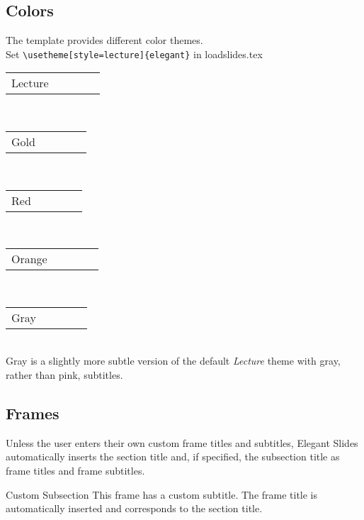 \documentclass[
11pt,notheorems,hyperref={pdfauthor=whatever}
]{beamer}
\begin{document}
\subsection{Colors}
\begin{frame}[fragile]
	\centering
	The template provides different color themes.\\
	Set \verb+\usetheme[style=lecture]{elegant}+ in loadslides.tex\\[0.8cm]
	\newcommand{\colorRow}[1]{
	\begin{tabular}{p{4cm}cccc}
	#1 & \cellcolor{primary}\hspace*{1cm} &\cellcolor{secondary}\hspace*{1cm}&\cellcolor{tertiary}\hspace*{1cm}\\
 	\end{tabular}
 	}
 	\colorRow{Lecture}\\[0.3cm]
 	\colorRow{Gold}\\[0.3cm]
 	\colorRow{Red}\\[0.3cm]
 	\colorRow{Orange}\\[0.3cm]
 	\colorRow{Gray}\\[0.3cm]

 \centering Gray is a slightly more subtle version of the default \textit{Lecture} theme with gray, rather than pink, subtitles. 
\end{frame}

\subsection{Frames}
\begin{frame}
    Unless the user enters their own custom frame titles and subtitles, Elegant Slides automatically inserts the section title and, if specified, the subsection title as frame titles and frame subtitles.
\end{frame}

\begin{frame}{}{Custom Subsection}
    This frame has a custom subtitle. The frame title is automatically inserted and corresponds to the section title.
\end{frame}
\end{document}
